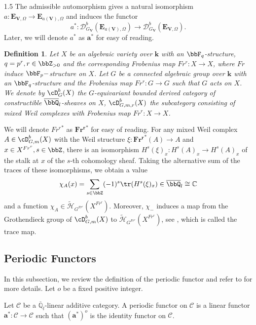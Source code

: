 \documentclass[10pt]{amsart}
\newtheorem{definition}[theorem]{Definition}
\def\cH{{\mathcal H}}   \def\cB{{\mathcal B}} \def\cS{{\mathcal S}} \def\fkS{{\frak S}}
\def\bbC{{\mathbb C}}  \def\bbE{{\mathbb E}}  \def\bbP{{\mathbb P}}
\begin{document}
\begin{spacing}{1.5}
The admissible automorphism gives a natural isomorphism $a: \mathbf{E}_{\mathbf{V}, \Omega} \to \mathbf{E}_{a(\mathbf{V}), \Omega}$ and induces the functor
$$
a^*: \mathcal{D}^b_{G_{\mathbf{V}}}(\mathbf{E}_{a(\mathbf{V}), \Omega}) \to \mathcal{D}^b_{G_{\mathbf{V}}}(\mathbf{E}_{\mathbf{V}, \Omega}).
$$
Later, we will denote $a^*$ as $\mathbf{a}^*$ for easy of reading. 
\begin{definition}
    Let $X$ be an algebraic variety over $\mathbf{k}$ with an $\bbF_q$-structure, $q=p^r,r\in \bbZ_{>0}$ and the corresponding Frobenius map $Fr^r:X\rightarrow X$, where $Fr$ induce $\bbF_p-$structure on $X$. Let $G$ be a connected algebraic group over $\mathbf{k}$ with an $\bbF_q$-structure and the Frobenius map $Fr^r:G\rightarrow G$ such that $G$ acts on $X$. We denote by $\cD_G^b(X)$ the $G$-equivariant bounded derived category of constructible $\overline{\bbQ}_l$-sheaves on $X$, $\cD^b_{G,m,r}(X)$ the subcategory consisting of mixed Weil complexes with Frobenius map $Fr^r:X\rightarrow X$.
\end{definition}
 We will denote ${Fr^r}^*$ as $\mathbf{Fr^r}^*$ for easy of reading.
For any mixed Weil complex $A\in \cD^b_{G,m}(X)$ with the Weil structure $\xi:\mathbf{Fr^r}^*(A)\rightarrow A$ and $x\in X^{Fr^r}, s\in \bbZ$, there is an isomorphism $H^s(\xi)_x:H^s(A)_x\rightarrow H^s(A)_x$ of the stalk at $x$ of the $s$-th cohomology sheaf. Taking the alternative sum of the traces of these isomorphisms, we obtain a value 
$$\chi_A(x)=\sum_{s\in \bbZ}(-1)^s\tr(H^s(\xi)_x)\in\overline{\bbQ}_l\cong \bbC$$
and a function $\chi_A\in \tilde{\cH}_{G^{Fr^r}}(X^{Fr^r})$. Moreover, $\chi_{-}$ induces a map from the Grothendieck group of $\cD^b_{G,m}(X)$ to $\tilde{\cH}_{G^{Fr^r}}(X^{Fr^r})$, see \cite[Lemma 5.3.12]{Pramod-2021}, which is called the trace map.
\subsection{Periodic Functors}

In this subsection, we review the definition of the periodic functor and refer to \cite[Chapter 11]{lusztig2010introduction} for more details. Let $o$ be a fixed positive integer.

Let $\mathcal{C}$ be a $\overline{\mathbb{Q}}_l$-linear additive category. A periodic functor on $\mathcal{C}$ is a linear functor $\mathbf{a}^*: \mathcal{C} \to \mathcal{C}$ such that $(\mathbf{a}^*)^o$ is the identity functor on $\mathcal{C}$.


\end{spacing}
\end{document}
